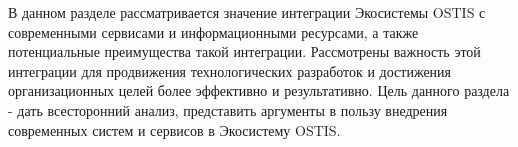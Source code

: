В данном разделе рассматривается значение интеграции Экосистемы OSTIS с современными сервисами и информационными ресурсами, а также потенциальные преимущества такой интеграции. Рассмотрены важность этой интеграции для продвижения технологических разработок и достижения организационных целей более эффективно и результативно.
Цель данного раздела - дать всесторонний анализ, представить аргументы в пользу внедрения современных систем и сервисов в Экосистему OSTIS.






%